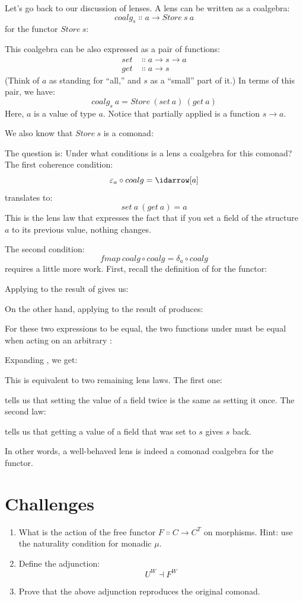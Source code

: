 Let's go back to our discussion of lenses. A lens can be written as a
coalgebra:
\[coalg_s \Colon a \to Store\ s\ a\]
for the functor $Store\ s$:

This coalgebra can be also expressed as a pair of functions:
\begin{align*}
set &\Colon a \to s \to a \\
get &\Colon a \to s
\end{align*}
(Think of $a$ as standing for ``all,'' and $s$ as a
``small'' part of it.) In terms of this pair, we have:
\[coalg_s\ a = Store\ (set\ a)\ (get\ a)\]
Here, $a$ is a value of type $a$. Notice that partially
applied  is a function $s \to a$.

We also know that $Store\ s$ is a comonad:

The question is: Under what conditions is a lens a coalgebra for this
comonad? The first coherence condition:
\[\varepsilon_a \circ coalg = \idarrow[a]\]
translates to:
\[set\ a\ (get\ a) = a\]
This is the lens law that expresses the fact that if you set a field of
the structure $a$ to its previous value, nothing changes.

The second condition:
\[fmap\ coalg \circ coalg = \delta_a \circ coalg\]
requires a little more work. First, recall the definition of
 for the  functor:

Applying  to the result of  gives us:

On the other hand, applying  to the result of
 produces:

For these two expressions to be equal, the two functions under
 must be equal when acting on an arbitrary :

Expanding , we get:

This is equivalent to two remaining lens laws. The first one:

tells us that setting the value of a field twice is the same as setting
it once. The second law:

tells us that getting a value of a field that was set to $s$
gives $s$ back.

In other words, a well-behaved lens is indeed a comonad coalgebra for
the  functor.

\section{Challenges}

\begin{enumerate}
\tightlist
\item
  What is the action of the free functor
  $F \Colon C \to C^T$ on morphisms. Hint: use the
  naturality condition for monadic $\mu$.
\item
  Define the adjunction:
\[U^W \dashv F^W\]
\item
  Prove that the above adjunction reproduces the original comonad.
\end{enumerate}
